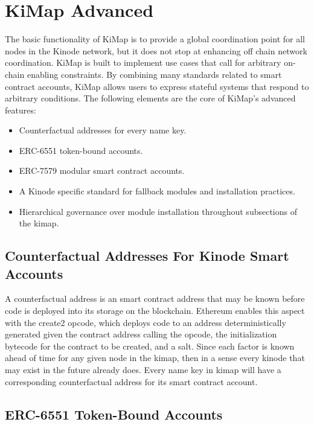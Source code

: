 \documentclass[runningheads]{llncs}
\begin{document}
%
%
%
\section{KiMap Advanced}
\label{sec:kimapadvanced}

The basic functionality of KiMap is to provide a global coordination point for all nodes in the Kinode network, but it does not stop at enhancing off chain network coordination.
KiMap is built to implement use cases that call for arbitrary on-chain enabling constraints.
By combining many standards related to smart contract accounts, KiMap allows users to express stateful systems that respond to arbitrary conditions.
The following elements are the core of KiMap's advanced features:

\begin{itemize}
\item Counterfactual addresses for every name key.
\item ERC-6551 token-bound accounts.
\item ERC-7579 modular smart contract accounts.
\item A Kinode specific standard for fallback modules and installation practices.
\item Hierarchical governance over module installation throughout subsections of the kimap.
\end{itemize}

\subsection{Counterfactual Addresses For Kinode Smart Accounts}

A counterfactual address is an smart contract address that may be known before code is deployed into its storage on the blockchain.
Ethereum enables this aspect with the create2 opcode, which deploys code to an address deterministically generated given the contract address calling the opcode, the initialization bytecode for the contract to be created, and a salt.
Since each factor is known ahead of time for any given node in the kimap, then in a sense every kinode that may exist in the future already does.
Every name key in kimap will have a corresponding counterfactual address for its smart contract account.

\subsection{ERC-6551 Token-Bound Accounts}
\end{document}
